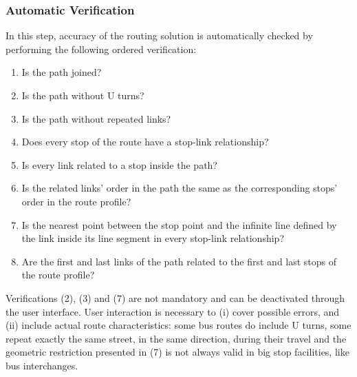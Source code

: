 \subsubsection{Automatic Verification}
In this step, accuracy of the routing solution is automatically checked by performing the following ordered verification:
%
\begin{enumerate}\styleEnumerate
\item Is the path joined?
\item Is the path without U turns?
\item Is the path without repeated links?
\item Does every stop of the route have a stop-link relationship?
\item Is every link related to a stop inside the path?
\item Is the related links' order in the path the same as the corresponding stops' order in the route profile?
\item Is the nearest point between the stop point and the infinite line defined by the link inside its line segment in every stop-link relationship?
\item Are the first and last links of the path related to the first and last  stops of the route profile?
\end{enumerate}

Verifications (2), (3) and (7) are not mandatory and can be deactivated through the user interface. User interaction is necessary to (i) cover possible errors, and (ii) include actual route characteristics: some bus routes do include U turns, some repeat exactly the same street, in the same direction, during their travel and the geometric restriction presented in (7) is not always valid in big stop facilities, like bus interchanges.

